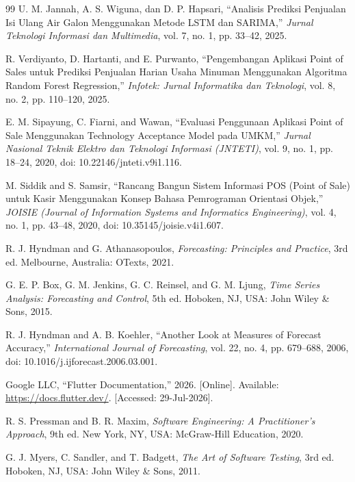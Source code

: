 \documentclass[10pt,a4paper]{article}
\begin{document}
\begin{thebibliography}{99}
U. M. Jannah, A. S. Wiguna, dan D. P. Hapsari, ``Analisis Prediksi Penjualan Isi Ulang Air Galon Menggunakan Metode LSTM dan SARIMA,'' \textit{Jurnal Teknologi Informasi dan Multimedia}, vol. 7, no. 1, pp. 33--42, 2025.

R. Verdiyanto, D. Hartanti, and E. Purwanto, ``Pengembangan Aplikasi Point of Sales untuk Prediksi Penjualan Harian Usaha Minuman Menggunakan Algoritma Random Forest Regression,'' \textit{Infotek: Jurnal Informatika dan Teknologi}, vol. 8, no. 2, pp. 110--120, 2025.

E. M. Sipayung, C. Fiarni, and Wawan, ``Evaluasi Penggunaan Aplikasi Point of Sale Menggunakan Technology Acceptance Model pada UMKM,'' \textit{Jurnal Nasional Teknik Elektro dan Teknologi Informasi (JNTETI)}, vol. 9, no. 1, pp. 18--24, 2020, doi: 10.22146/jnteti.v9i1.116.

M. Siddik and S. Samsir, ``Rancang Bangun Sistem Informasi POS (Point of Sale) untuk Kasir Menggunakan Konsep Bahasa Pemrograman Orientasi Objek,'' \textit{JOISIE (Journal of Information Systems and Informatics Engineering)}, vol. 4, no. 1, pp. 43--48, 2020, doi: 10.35145/joisie.v4i1.607.

R. J. Hyndman and G. Athanasopoulos, \textit{Forecasting: Principles and Practice}, 3rd ed. Melbourne, Australia: OTexts, 2021.

G. E. P. Box, G. M. Jenkins, G. C. Reinsel, and G. M. Ljung, \textit{Time Series Analysis: Forecasting and Control}, 5th ed. Hoboken, NJ, USA: John Wiley \& Sons, 2015.

R. J. Hyndman and A. B. Koehler, ``Another Look at Measures of Forecast Accuracy,'' \textit{International Journal of Forecasting}, vol. 22, no. 4, pp. 679--688, 2006, doi: 10.1016/j.ijforecast.2006.03.001.

Google LLC, ``Flutter Documentation,'' 2026. [Online]. Available: \url{https://docs.flutter.dev/}. [Accessed: 29-Jul-2026].

R. S. Pressman and B. R. Maxim, \textit{Software Engineering: A Practitioner's Approach}, 9th ed. New York, NY, USA: McGraw-Hill Education, 2020.

G. J. Myers, C. Sandler, and T. Badgett, \textit{The Art of Software Testing}, 3rd ed. Hoboken, NJ, USA: John Wiley \& Sons, 2011.


\end{thebibliography}
\end{document}

